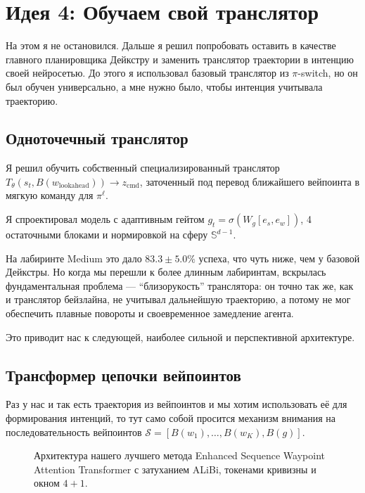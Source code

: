 \section{Идея 4: Обучаем свой транслятор}

На этом я не остановился. Дальше я решил попробовать оставить в качестве главного планировщика Дейкстру и заменить транслятор траектории в интенцию своей нейросетью. До этого я использовал базовый транслятор из $\pi$-switch, но он был обучен универсально, а мне нужно было, чтобы интенция учитывала траекторию.

\subsection{Одноточечный транслятор}

Я решил обучить собственный специализированный транслятор $T_\theta(s_t, B(w_{\text{lookahead}})) \to z_{\text{cmd}}$, заточенный под перевод ближайшего вейпоинта в мягкую команду для $\pi^\ell$.

Я спроектировал модель с адаптивным гейтом $g_t = \sigma(W_g [e_s, e_w])$, 4 остаточными блоками и нормировкой на сферу $\mathbb{S}^{d-1}$. 

На лабиринте Medium это дало $83.3 \pm 5.0\%$ успеха, что чуть ниже, чем у базовой Дейкстры. Но когда мы перешли к более длинным лабиринтам, вскрылась фундаментальная проблема — \enquote{близорукость} транслятора: он точно так же, как и транслятор бейзлайна, не учитывал дальнейшую траекторию, а потому не мог обеспечить плавные повороты и своевременное замедление агента.

Это приводит нас к следующей, наиболее сильной и перспективной архитектуре.

\subsection{Трансформер цепочки вейпоинтов}

Раз у нас и так есть траектория из вейпоинтов и мы хотим использовать её для формирования интенций, то тут само собой просится механизм внимания на последовательность вейпоинтов $\mathcal{S} = [B(w_1), \dots, B(w_K), B(g)]$.

\begin{figure}[t]
    \centering
    
    \caption{Архитектура нашего лучшего метода Enhanced Sequence Waypoint Attention Transformer с затуханием ALiBi, токенами кривизны и окном $4+1$.}
    \label{fig:seq_transformer}
\end{figure}

